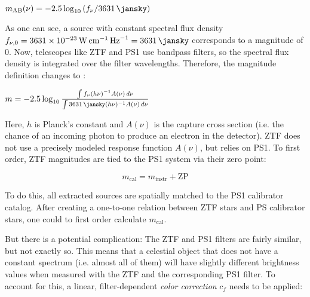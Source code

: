 \begin{definition}
$m_{\text{AB}}(\nu) = -2.5 \log_{10}{(f_\nu/\SI{3631}{\jansky})}$
\end{definition}

As one can see, a source with constant spectral flux density $f_{\nu,0} = \SI{3631e-23}{\W\per\cm\per\Hz} = \SI{3631}{\jansky}$ corresponds to a magnitude of 0. Now, telescopes like ZTF and PS1 use bandpass filters, so the spectral flux density is integrated over the filter wavelengths. Therefore, the magnitude definition changes to :

\begin{definition}
$m = -2.5 \log_{10}{\frac{\int{f_\nu(h \nu)^{-1}A(\nu)\,d\nu}}{\int{\SI{3631}{\jansky}(h \nu)^{-1}A(\nu)\,d\nu }}}$
\end{definition}
Here, $h$ is Planck's constant and $A(\nu)$ is the capture cross section (i.e. the chance of an incoming photon to produce an electron in the detector). ZTF does not use a precisely modeled response function $A(\nu)$, but relies on PS1. To first order, ZTF magnitudes are tied to the PS1 system via their zero point:

\begin{equation}
m_\text{cal} = m_\text{instr} + \text{ZP}
\end{equation}

To do this, all extracted sources are spatially matched to the PS1 calibrator catalog. After creating a one-to-one relation between ZTF stars and PS calibrator stars, one could to first order calculate $m_\text{cal}$.

But there is a potential complication: The ZTF and PS1 filters are fairly similar, but not exactly so. This means that a celestial object that does not have a constant spectrum (i.e. almost all of them) will have slightly different brightness values when measured with the ZTF and the corresponding PS1 filter. To account for this, a linear, filter-dependent \textit{color correction} $c_f$ needs to be applied:


